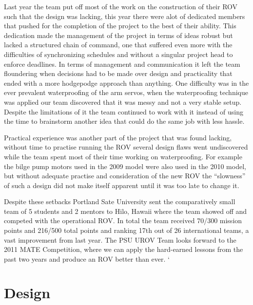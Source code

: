 \documentclass{proposalnsf}
\begin{document}
Last year the team put off most of the work on the construction of their ROV such that the design was lacking, this year there were alot of dedicated members that pushed for the completion
of the project to the best of their ability.  This dedication made the management of the project in terms of ideas robust but lacked a structured chain of command, one that suffered even more with the difficulties
of synchronizing schedules and without a singular project head to enforce deadlines.  In terms of management and communication it left the team floundering when decisions had to be made over design and practicality 
that ended with a more hodgepodge approach than anything.  
One difficulty was in the ever prevalent waterproofing of the arm servos, when the waterproofing technique was applied our team discovered that it 
was messy and not a very stable setup.  Despite the limitations of it the team continued to work with it instead of using the time to brainstorm another idea that could do the same job with less hassle.

Practical experience was another part of the project that was found lacking, without time to practise running the ROV several design flaws went undiscovered while the team spent most of their time
working on waterproofing.  For example the bilge pump motors used in the 2009 model were also used in the 2010 model, but without adequate practise and consideration of the new ROV
the ``slowness'' of such a design did not make itself apparent until it was too late to change it.  

Despite these setbacks Portland Sate University sent the comparatively small team of 5 students and 2 mentors to Hilo, Hawaii where the team showed off and competed with the operational ROV.  In total the team received 70/300 
mission points and 216/500 total points and ranking 17th out of 26 international teams, a vast improvement from last year.  The PSU UROV Team looks forward to the 2011 MATE Competition, where we can apply the hard-earned
lessons from the past two years and produce an ROV better than ever.
`

\renewcommand{\thepage} {D--\arabic{page}}

\section{Design}
\end{document}
